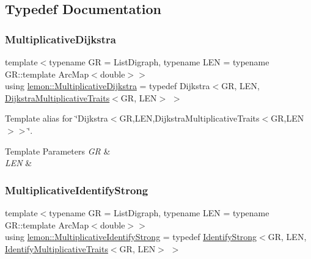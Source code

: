 \subsection{Typedef Documentation}
\mbox{\label{namespacelemon_a08ac5476d368240ee966058c30364c62}} 
\subsubsection{\texorpdfstring{Multiplicative\+Dijkstra}{MultiplicativeDijkstra}}
{\footnotesize\ttfamily template$<$typename GR  = List\+Digraph, typename L\+EN  = typename G\+R\+::template Arc\+Map$<$double$>$$>$ \\
using \hyperlink{namespacelemon_a08ac5476d368240ee966058c30364c62}{lemon\+::\+Multiplicative\+Dijkstra} = typedef Dijkstra$<$GR, L\+EN, \hyperlink{structlemon_1_1_dijkstra_multiplicative_traits}{Dijkstra\+Multiplicative\+Traits}$<$GR, L\+EN$>$ $>$}



Template alias for \char`\"{}\+Dijkstra$<$\+G\+R,\+L\+E\+N,\+Dijkstra\+Multiplicative\+Traits$<$\+G\+R,\+L\+E\+N$>$$>$\char`\"{}. 


\begin{DoxyTemplParams}{Template Parameters}
{\em GR} & \\
\hline
{\em L\+EN} & \\
\hline
\end{DoxyTemplParams}
\mbox{\label{namespacelemon_ad1a4144cc98e6319e6e0c6144223631e}} 
\subsubsection{\texorpdfstring{Multiplicative\+Identify\+Strong}{MultiplicativeIdentifyStrong}}
{\footnotesize\ttfamily template$<$typename GR  = List\+Digraph, typename L\+EN  = typename G\+R\+::template Arc\+Map$<$double$>$$>$ \\
using \hyperlink{namespacelemon_ad1a4144cc98e6319e6e0c6144223631e}{lemon\+::\+Multiplicative\+Identify\+Strong} = typedef \hyperlink{classlemon_1_1_identify_strong}{Identify\+Strong}$<$GR, L\+EN, \hyperlink{structlemon_1_1_identify_multiplicative_traits}{Identify\+Multiplicative\+Traits}$<$GR, L\+EN$>$ $>$}

